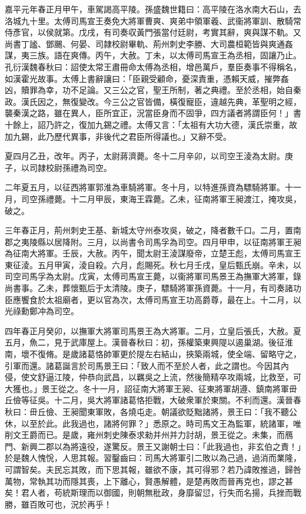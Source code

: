 \begin{pinyinscope}
嘉平元年春正月甲午，車駕謁高平陵。孫盛魏世籍曰：高平陵在洛水南大石山，去洛城九十里。太傅司馬宣王奏免大將軍曹爽、爽弟中領軍羲、武衞將軍訓、散騎常侍彥官，以侯就第。戊戌，有司奏収黃門張當付廷尉，考實其辭，爽與謀不軌。又尚書丁謐、鄧颺、何晏、司隷校尉畢軌、荊州刺史李勝、大司農桓範皆與爽通姦謀，夷三族。語在爽傳。丙午，大赦。丁未，以太傅司馬宣王為丞相，固讓乃止。孔衍漢魏春秋曰：詔使太常王肅冊命太傅為丞相，增邑萬戶，羣臣奏事不得稱名，如漢霍光故事。太傅上書辭讓曰：「臣親受顧命，憂深責重，憑賴天威，摧弊姦凶，贖罪為幸，功不足論。又三公之官，聖王所制，著之典禮。至於丞相，始自秦政。漢氏因之，無復變改。今三公之官皆備，橫復寵臣，違越先典，革聖明之經，襲秦漢之路，雖在異人，臣所宜正，況當臣身而不固爭，四方議者將謂臣何！」書十餘上，詔乃許之，復加九錫之禮。太傅又言：「太祖有大功大德，漢氏崇重，故加九錫，此乃歷代異事，非後代之君臣所得議也。」又辭不受。

夏四月乙丑，改年。丙子，太尉蔣濟薨。冬十二月辛卯，以司空王淩為太尉。庚子，以司隷校尉孫禮為司空。

二年夏五月，以征西將軍郭淮為車騎將軍。冬十月，以特進孫資為驃騎將軍。十一月，司空孫禮薨。十二月甲辰，東海王霖薨。乙未，征南將軍王昶渡江，掩攻吳，破之。

三年春正月，荊州刺史王基、新城太守州泰攻吳，破之，降者數千口。二月，置南郡之夷陵縣以居降附。三月，以尚書令司馬孚為司空。四月甲申，以征南將軍王昶為征南大將軍。壬辰，大赦。丙午，聞太尉王淩謀廢帝，立楚王彪，太傅司馬宣王東征淩。五月甲寅，淩自殺。六月，彪賜死。秋七月壬戌，皇后甄氏崩。辛未，以司空司馬孚為太尉。戊寅，太傅司馬宣王薨，以衞將軍司馬景王為撫軍大將軍，錄尚書事。乙未，葬懷甄后于太清陵。庚子，驃騎將軍孫資薨。十一月，有司奏諸功臣應饗食於太祖廟者，更以官為次，太傅司馬宣王功高爵尊，最在上。十二月，以光祿勳鄭冲為司空。

四年春正月癸卯，以撫軍大將軍司馬景王為大將軍。二月，立皇后張氏，大赦。夏五月，魚二，見于武庫屋上。漢晉春秋曰：初，孫權築東興隄以遏巢湖。後征淮南，壞不復脩。是歲諸葛恪帥軍更於隄左右結山，挾築兩城，使全端、留略守之，引軍而還。諸葛誕言於司馬景王曰：「致人而不至於人者，此之謂也。今因其內侵，使文舒逼江陵，仲恭向武昌，以羈吳之上流，然後簡精卒攻兩城，比救至，可大獲也。」景王從之。冬十一月，詔征南大將軍王昶、征東將軍胡遵、鎮南將軍毌丘儉等征吳。十二月，吳大將軍諸葛恪拒戰，大破衆軍於東關。不利而還。漢晉春秋曰：毌丘儉、王昶聞東軍敗，各燒屯走。朝議欲貶黜諸將，景王曰：「我不聽公休，以至於此。此我過也，諸將何罪？」悉原之。時司馬文王為監軍，統諸軍，唯削文王爵而已。是歲，雍州刺史陳泰求勑并州并力討胡，景王從之。未集，而鴈門、新興二郡以為將遠役，遂驚反。景王又謝朝士曰：「此我過也，非玄伯之責！」於是魏人愧恱，人思其報。習鑿齒曰：司馬大將軍引二敗以為己過，過消而業隆，可謂智矣。夫民忘其敗，而下思其報，雖欲不康，其可得邪？若乃諱敗推過，歸咎萬物，常執其功而隱其喪，上下離心，賢愚解體，是楚再敗而晉再克也，謬之甚矣！君人者，苟統斯理而以御國，則朝無秕政，身靡留愆，行失而名揚，兵挫而戰勝，雖百敗可也，況於再乎！


\end{pinyinscope}
